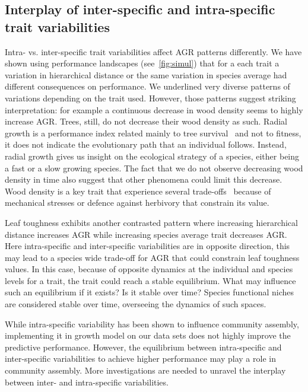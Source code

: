 \subsection*{Interplay of inter-specific and intra-specific trait variabilities}

Intra- vs. inter-specific trait variabilities affect AGR patterns differently. We have shown using performance landscapes (see~\autoref{fig:simul}) that for a each trait a variation in hierarchical distance or the same variation in species average had different consequences on performance. We underlined very diverse patterns of variations depending on the trait used. However, those patterns suggest striking interpretation: for example a continuous decrease in wood density seems to highly increase AGR. Trees, still, do not decrease their wood density as such. Radial growth is a performance index related mainly to tree survival~\citep{aubry-kientz_vigor_2015} and not to fitness, it does not indicate the evolutionary path that an individual follows. Instead, radial growth gives us insight on the ecological strategy of a species, either being a fast or a slow growing species. The fact that we do not observe decreasing wood density in time also suggest that other phenomena could limit this decrease. Wood density is a key trait that experience several trade-offs~\citep{chave_towards_2009} because of mechanical stresses or defence against herbivory that constrain its value.

Leaf toughness exhibits another contrasted pattern where increasing hierarchical distance increases AGR while increasing species average trait decreases AGR. Here intra-specific and inter-specific variabilities are in opposite direction, this may lead to a species wide trade-off for AGR that could constrain leaf toughness values. In this case,  because of opposite dynamics at the individual and species levels for a trait, the trait could reach a stable equilibrium. What may influence such an equilibrium if it exists? Is it stable over time? Species functional niches are considered stable over time, overseeing the dynamics of such spaces.

While intra-specific variability has been shown to influence community assembly, implementing it in growth model on our data sets does not highly improve the predictive performance. However, the equilibrium between intra-specific and inter-specific variabilities to achieve higher performance may play a role in community assembly. More investigations are needed to unravel the interplay between inter- and intra-specific variabilities.